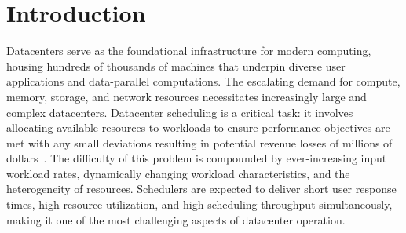 \chapter{Introduction}
\label{firstcontentpage} %

%
%

%

Datacenters serve as the foundational infrastructure for modern computing,
housing hundreds of thousands of machines that underpin diverse user
applications and data-parallel computations. The escalating demand for compute,
memory, storage, and network resources necessitates increasingly large and
complex datacenters. Datacenter scheduling is a critical task: it involves
allocating available resources to workloads to ensure performance objectives
are met with any small deviations resulting in potential revenue losses of
millions of dollars~\cite{barroso2019datacenter}. The difficulty of this problem is compounded by
ever-increasing input workload rates, dynamically changing workload
characteristics, and the heterogeneity of resources. Schedulers are expected to
deliver short user response times, high resource utilization, and high
scheduling throughput simultaneously, making it one of the most challenging
aspects of datacenter operation.


